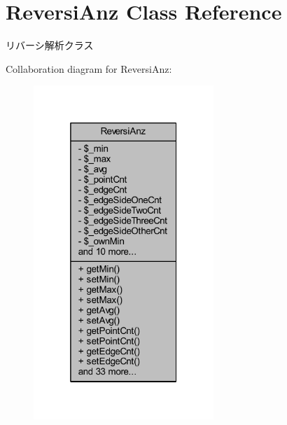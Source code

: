 \hypertarget{class_reversi_anz}{}\section{Reversi\+Anz Class Reference}
\label{class_reversi_anz}


リバーシ解析クラス  




Collaboration diagram for Reversi\+Anz\+:\nopagebreak
\begin{figure}[H]
\begin{center}
\leavevmode
\includegraphics[width=193pt]{class_reversi_anz__coll__graph}
\end{center}
\end{figure}
